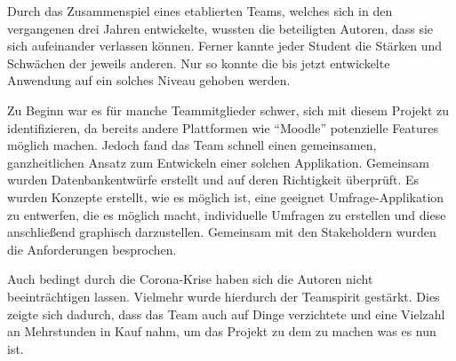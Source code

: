 Durch das Zusammenspiel eines etablierten Teams, welches sich in den vergangenen drei Jahren entwickelte, wussten die beteiligten Autoren, dass sie sich aufeinander verlassen können.
Ferner kannte jeder Student die Stärken und Schwächen der jeweils anderen.
Nur so konnte die bis jetzt entwickelte Anwendung auf ein solches Niveau gehoben werden.

Zu Beginn war es für manche Teammitglieder schwer, sich mit diesem Projekt zu identifizieren, da bereits andere Plattformen wie \enquote{Moodle} potenzielle Features möglich machen.
Jedoch fand das Team schnell einen gemeinsamen, ganzheitlichen Ansatz zum Entwickeln einer solchen Applikation.
Gemeinsam wurden Datenbankentwürfe erstellt und auf deren Richtigkeit überprüft.
Es wurden Konzepte erstellt, wie es möglich ist, eine geeignet Umfrage-Applikation zu entwerfen, die es möglich macht, individuelle Umfragen zu erstellen und diese anschließend graphisch darzustellen.
Gemeinsam mit den Stakeholdern wurden die Anforderungen besprochen.

Auch bedingt durch die Corona-Krise haben sich die Autoren nicht beeinträchtigen lassen. 
Vielmehr wurde hierdurch der Teamspirit gestärkt. 
Dies zeigte sich \ua dadurch, dass das Team auch auf Dinge verzichtete und eine Vielzahl an Mehrstunden in Kauf nahm, um das Projekt zu dem zu machen was es nun ist. 
